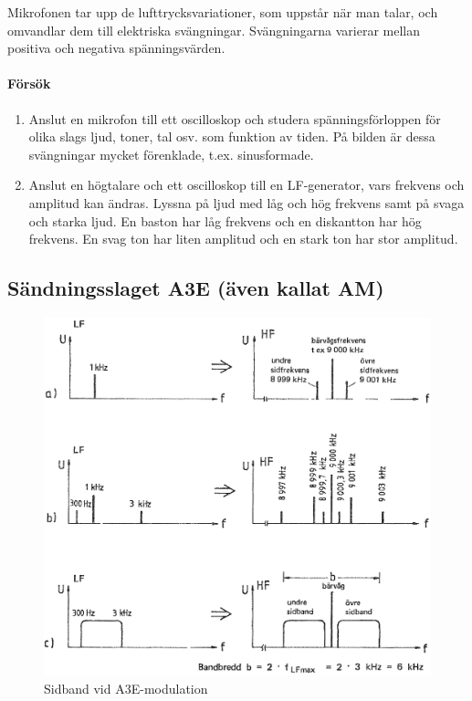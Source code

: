 Mikrofonen tar upp de lufttrycksvariationer, som uppstår när man talar, och
omvandlar dem till elektriska svängningar.
Svängningarna varierar mellan positiva och negativa spänningsvärden.

\paragraph{Försök}

\begin{enumerate}
	
\item Anslut en mikrofon till ett oscilloskop och studera spänningsförloppen
  för olika slags ljud, toner, tal osv. som funktion av tiden.
  På bilden är dessa svängningar mycket förenklade, t.ex. sinusformade.

\item Anslut en högtalare och ett oscilloskop till en LF-generator, vars
frekvens och amplitud kan ändras. Lyssna på ljud med låg och hög frekvens samt
på svaga och starka ljud.
En baston har låg frekvens och en diskantton har hög frekvens.
En svag ton har liten amplitud och en stark ton har stor amplitud.
\end{enumerate}

\subsection{Sändningsslaget A3E (även kallat AM)}

\begin{figure}
\includegraphics[width=\textwidth]{images/cropped_pdfs/bild_2_1-24.pdf}
\caption{Sidband vid A3E-modulation}
\label{fig:BildII1-24}
\end{figure}

